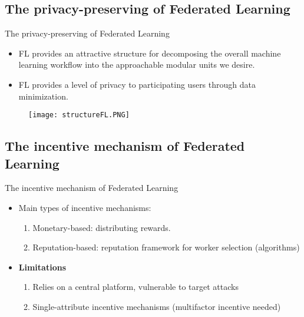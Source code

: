 \subsection{The privacy-preserving of Federated Learning}
\begin{frame}{The privacy-preserving of Federated Learning}
    \begin{itemize}
        \item FL provides an attractive structure for decomposing the overall machine learning workflow into the approachable modular units we desire.%
        \item FL provides a level of privacy to participating users through data minimization.
    \end{itemize}
    \begin{figure}[h]
        \centering
        \texttt{[image: structureFL.PNG]}
    \end{figure}
\end{frame}

\subsection{The incentive mechanism of Federated Learning}
\begin{frame}{The incentive mechanism of Federated Learning}
  \begin{itemize}
    \item Main types of incentive mechanisms:
          \begin{enumerate}
            \item \alert{Monetary-based}: distributing rewards. %
            \item \alert{Reputation-based}: reputation framework for worker selection (algorithms)
          \end{enumerate}
    \item \textbf{Limitations}
    	\begin{enumerate}
            \item Relies on a central platform, vulnerable to target attacks
            \item Single-attribute incentive mechanisms (multifactor incentive needed)
          \end{enumerate}
  \end{itemize}
\end{frame}

